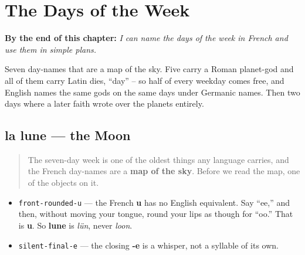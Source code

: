
\chapter{The Days of the Week}
\label{ch:days}

\begin{chapteropening}
\textbf{By the end of this chapter:} \emph{I can name the days of the week in French and use them in simple plans.}

Seven day-names that are a map of the sky. Five carry a Roman planet-god and all of them carry Latin dies, \textquotedblleft{}day\textquotedblright{} -- so half of every weekday comes free, and English names the same gods on the same days under Germanic names. Then two days where a later faith wrote over the planets entirely.
\end{chapteropening}

\section[la lune]{la lune — the Moon}

\label{lesson:FR-C07-lune}



\begin{quote}
The seven-day week is one of the oldest things any language carries, and the French day-names are a \textbf{map of the sky}. Before we read the map, one of the objects on it.
\end{quote}

\begin{sounds}
\begin{itemize}
\raggedright
  \item \texttt{front-rounded-u} — the French \textbf{u} has no English equivalent. Say \textquotedblleft{}ee,\textquotedblright{} and then, without moving your tongue, round your lips as though for \textquotedblleft{}oo.\textquotedblright{} That is \textbf{u}. So \textbf{lune} is \emph{lün}, never \emph{loon}.
  \item \texttt{silent-final-e} — the closing \textbf{-e} is a whisper, not a syllable of its own.
\end{itemize}
\end{sounds}

